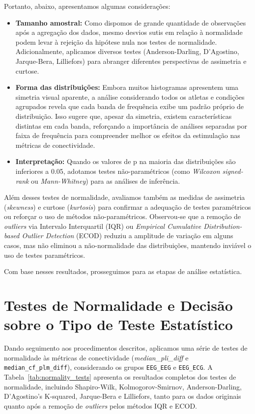 Portanto, abaixo, apresentamos algumas considerações:
\begin{itemize}
    \item \textbf{Tamanho amostral:} Como dispomos de grande quantidade de observações após a agregação dos dados, mesmo desvios sutis em relação à normalidade podem levar à rejeição da hipótese nula nos testes de normalidade. 
    Adicionalmente, aplicamos diversos testes (Anderson-Darling, D'Agostino, Jarque-Bera, Lilliefors) para abranger diferentes perspectivas de assimetria e curtose.
    \item \textbf{Forma das distribuições:} Embora muitos histogramas apresentem uma simetria visual aparente, a análise considerando todos os atletas e condições agrupados revela que cada banda de frequência exibe um padrão próprio de distribuição. Isso sugere que, apesar da simetria, existem características distintas em cada banda, reforçando a importância de análises separadas por faixa de frequência para compreender melhor os efeitos da estimulação nas métricas de conectividade.
    \item \textbf{Interpretação:} Quando os valores de p na maioria das distribuições são inferiores a 0.05, adotamos testes não-paramétricos (como \textit{Wilcoxon signed-rank} ou \textit{Mann-Whitney}) para as análises de inferência.
\end{itemize}

Além desses testes de normalidade, avaliamos também as medidas de assimetria (\textit{skewness}) e curtose (\textit{kurtosis}) para confirmar a adequação de testes paramétricos ou reforçar o uso de métodos não-paramétricos. 
Observou-se que a remoção de \textit{outliers} via Intervalo Interquartil (IQR) ou \textit{Empirical Cumulative Distribution-based Outlier Detection} (ECOD) reduziu a amplitude de variação em alguns casos, mas não eliminou a não-normalidade das distribuições, mantendo inviável o uso de testes paramétricos.

Com base nesses resultados, prosseguimos para as etapas de análise estatística.

\section{Testes de Normalidade e Decisão sobre o Tipo de Teste Estatístico}
Dando seguimento aos procedimentos descritos, aplicamos uma série de testes de normalidade às métricas de conectividade (\textit{median\_pli\_diff} e \texttt{median\_cf\_plm\_diff}), considerando os grupos \texttt{EEG\_EEG} e \texttt{EEG\_ECG}. A Tabela~\ref{tab:normality_tests} apresenta os resultados completos dos testes de normalidade, incluindo Shapiro-Wilk, Kolmogorov-Smirnov, Anderson-Darling, D'Agostino's K-squared, Jarque-Bera e Lilliefors, tanto para os dados originais quanto após a remoção de \textit{outliers} pelos métodos IQR e ECOD.

